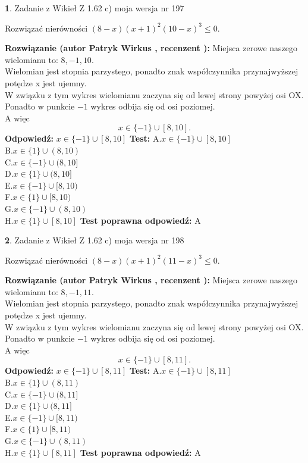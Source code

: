 \documentclass[12pt, a4paper]{article}
\theoremstyle{definition} %
\newtheorem{zad}{}
\newcommand{\zadStart}[1]{\begin{zad}#1\newline}
\newcommand{\zadStop}{\end{zad}}
\newcommand{\rozwStart}[2]{\noindent \textbf{Rozwiązanie (autor #1 , recenzent #2): }\newline}
\newcommand{\rozwStop}{\newline}
\newcommand{\odpStart}{\noindent \textbf{Odpowiedź:}\newline}
\newcommand{\odpStop}{\newline}
\newcommand{\testStart}{\noindent \textbf{Test:}\newline}
\newcommand{\testStop}{\newline}
\newcommand{\kluczStart}{\noindent \textbf{Test poprawna odpowiedź:}\newline}
\newcommand{\kluczStop}{\newline}
\begin{document}
\zadStart{Zadanie z Wikieł Z 1.62 c) moja wersja nr 197}

Rozwiązać nierówności $(8-x)(x+1)^{2}(10-x)^{3}\le0$.
\zadStop
\rozwStart{Patryk Wirkus}{}
Miejsca zerowe naszego wielomianu to: $8, -1, 10$.\\
Wielomian jest stopnia parzystego, ponadto znak współczynnika przy\linebreak najwyższej potędze x jest ujemny.\\ W związku z tym wykres wielomianu zaczyna się od lewej strony powyżej osi OX.\\
Ponadto w punkcie $-1$ wykres odbija się od osi poziomej.\\
A więc $$x \in \{-1\} \cup [8,10].$$
\rozwStop
\odpStart
$x \in \{-1\} \cup [8,10]$
\odpStop
\testStart
A.$x \in \{-1\} \cup [8,10]$\\
B.$x \in \{1\} \cup (8,10)$\\
C.$x \in \{-1\} \cup (8,10]$\\
D.$x \in \{1\} \cup (8,10]$\\
E.$x \in \{-1\} \cup [8,10)$\\
F.$x \in \{1\} \cup [8,10)$\\
G.$x \in \{-1\} \cup (8,10)$\\
H.$x \in \{1\} \cup [8,10]$
\testStop
\kluczStart
A
\kluczStop



\zadStart{Zadanie z Wikieł Z 1.62 c) moja wersja nr 198}

Rozwiązać nierówności $(8-x)(x+1)^{2}(11-x)^{3}\le0$.
\zadStop
\rozwStart{Patryk Wirkus}{}
Miejsca zerowe naszego wielomianu to: $8, -1, 11$.\\
Wielomian jest stopnia parzystego, ponadto znak współczynnika przy\linebreak najwyższej potędze x jest ujemny.\\ W związku z tym wykres wielomianu zaczyna się od lewej strony powyżej osi OX.\\
Ponadto w punkcie $-1$ wykres odbija się od osi poziomej.\\
A więc $$x \in \{-1\} \cup [8,11].$$
\rozwStop
\odpStart
$x \in \{-1\} \cup [8,11]$
\odpStop
\testStart
A.$x \in \{-1\} \cup [8,11]$\\
B.$x \in \{1\} \cup (8,11)$\\
C.$x \in \{-1\} \cup (8,11]$\\
D.$x \in \{1\} \cup (8,11]$\\
E.$x \in \{-1\} \cup [8,11)$\\
F.$x \in \{1\} \cup [8,11)$\\
G.$x \in \{-1\} \cup (8,11)$\\
H.$x \in \{1\} \cup [8,11]$
\testStop
\kluczStart
A
\kluczStop
\end{document}
